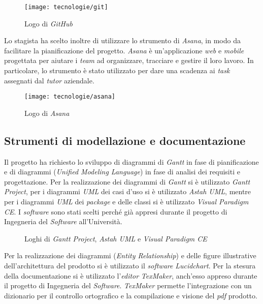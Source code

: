 \begin{figure}[!h] 
    \centering 
    \texttt{[image: tecnologie/git]} 
    \caption{Logo di \textit{GitHub}}
\end{figure}

Lo stagista ha scelto inoltre di utilizzare lo strumento di  \textit{Asana}, in modo da facilitare la pianificazione del progetto. \textit{Asana} è un'applicazione \textit{web} e \textit{mobile} progettata per aiutare i \textit{team} ad organizzare, tracciare e gestire il loro lavoro. In particolare, lo strumento è stato utilizzato per dare una scadenza ai \textit{task} assegnati dal \textit{tutor} aziendale.

\begin{figure}[!h] 
    \centering 
    \texttt{[image: tecnologie/asana]} 
    \caption{Logo di \textit{Asana}}
\end{figure}

\subsection{Strumenti di modellazione e documentazione}

Il progetto ha richiesto lo sviluppo di diagrammi di \textit{Gantt} in fase di pianificazione e di diagrammi  (\textit{Unified Modeling Language}) in fase di analisi dei requisiti e progettazione. Per la realizzazione dei diagrammi di \textit{Gantt} si è utilizzato \textit{Gantt Project}, per i diagrammi \textit{UML} dei casi d'uso si è utilizzato \textit{Astah UML}, mentre per i diagrammi \textit{UML} dei \textit{package} e delle classi si è utilizzato \textit{Visual Paradigm CE}. I \textit{software} sono stati scelti perché già appresi durante il progetto di Ingegneria del \textit{Software} all'Università.

\begin{figure}[!h] 
    \centering 
    \caption{Loghi di \textit{Gantt Project}, \textit{Astah UML} e \textit{Visual Paradigm CE}}
\end{figure}

Per la realizzazione dei diagrammi  (\textit{Entity Relationship}) e delle figure illustrative dell'architettura del prodotto si è utilizzato il \textit{software} \textit{Lucidchart}. Per la stesura della documentazione si è utilizzato l'\textit{editor} \textit{TexMaker}, anch'esso appreso durante il progetto di Ingegneria del \textit{Software}. \textit{TexMaker} permette l'integrazione con un dizionario per il controllo ortografico e la compilazione e visione del \textit{pdf} prodotto.

